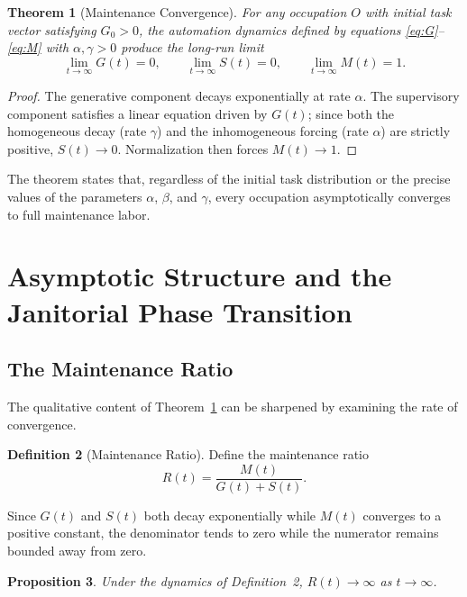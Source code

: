 \documentclass[12pt,a4paper]{article}
\theoremstyle{plain}
\newtheorem{theorem}{Theorem}[section]
\newtheorem{proposition}[theorem]{Proposition}
\theoremstyle{definition}
\newtheorem{definition}[theorem]{Definition}
\theoremstyle{remark}
\begin{document}
\begin{theorem}[Maintenance Convergence]
\label{thm:convergence}
For any occupation $O$ with initial task vector satisfying $G_0 > 0$, the
automation dynamics defined by equations \eqref{eq:G}--\eqref{eq:M} with
$\alpha, \gamma > 0$ produce the long-run limit
\[
\lim_{t\to\infty} G(t) = 0, \qquad
\lim_{t\to\infty} S(t) = 0, \qquad
\lim_{t\to\infty} M(t) = 1.
\]
\end{theorem}

\begin{proof}
The generative component decays exponentially at rate $\alpha$.  The
supervisory component satisfies a linear equation driven by $G(t)$; since
both the homogeneous decay (rate $\gamma$) and the inhomogeneous forcing
(rate $\alpha$) are strictly positive, $S(t) \to 0$.  Normalization then
forces $M(t) \to 1$.
\end{proof}

The theorem states that, regardless of the initial task distribution or the
precise values of the parameters $\alpha$, $\beta$, and $\gamma$, every
occupation asymptotically converges to full maintenance labor.

\section{Asymptotic Structure and the Janitorial Phase Transition}
\label{sec:asymptotic}

\subsection{The Maintenance Ratio}

The qualitative content of Theorem~\ref{thm:convergence} can be sharpened
by examining the rate of convergence.

\begin{definition}[Maintenance Ratio]
Define the maintenance ratio
\[
R(t) = \frac{M(t)}{G(t) + S(t)}.
\]
\end{definition}

Since $G(t)$ and $S(t)$ both decay exponentially while $M(t)$ converges to a
positive constant, the denominator tends to zero while the numerator remains
bounded away from zero.

\begin{proposition}
\label{prop:divergence}
Under the dynamics of Definition~2, $R(t) \to \infty$ as $t \to \infty$.
\end{proposition}
\end{document}
